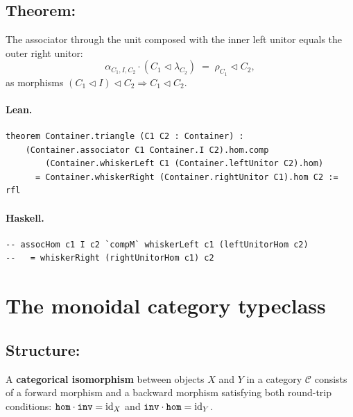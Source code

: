 \documentclass[11pt,a4paper]{article}
\begin{document}
\subsection{Theorem: }

\begin{thm}
The associator through the unit composed with the inner left unitor equals
the outer right unitor:
\[
  \alpha_{C_1, I, C_2} \cdot (C_1 \triangleleft \lambda_{C_2})
  \;=\;
  \rho_{C_1} \triangleleft C_2,
\]
as morphisms $(C_1 \triangleleft I) \triangleleft C_2 \Rightarrow C_1 \triangleleft C_2$.
\end{thm}

\paragraph{Lean.}
\begin{lstlisting}[style=lean]
theorem Container.triangle (C1 C2 : Container) :
    (Container.associator C1 Container.I C2).hom.comp
        (Container.whiskerLeft C1 (Container.leftUnitor C2).hom)
      = Container.whiskerRight (Container.rightUnitor C1).hom C2 := rfl
\end{lstlisting}

\paragraph{Haskell.}
\begin{lstlisting}[style=haskell]
-- assocHom c1 I c2 `compM` whiskerLeft c1 (leftUnitorHom c2)
--   = whiskerRight (rightUnitorHom c1) c2
\end{lstlisting}


\section{The monoidal category typeclass}

\subsection{Structure: }

\begin{defn}
A \textbf{categorical isomorphism} between objects $X$ and $Y$ in a category
$\mathcal{C}$ consists of a forward morphism  and a backward morphism
 satisfying both round-trip conditions:
$\texttt{hom} \cdot \texttt{inv} = \mathrm{id}_X$ and
$\texttt{inv} \cdot \texttt{hom} = \mathrm{id}_Y$.
\end{defn}
\end{document}
